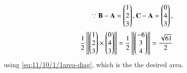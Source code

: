 \begin{align}
\because \mathbf{B}-\mathbf{A} = \begin{pmatrix}1\\2\\3\end{pmatrix}, 
\mathbf{C}-\mathbf{A} = \begin{pmatrix}0\\4\\3\end{pmatrix},
\\
	\frac{1}{2} \left\lVert\begin{pmatrix}1\\2\\3\end{pmatrix} \times \begin{pmatrix}0\\4\\3\end{pmatrix}\right\rVert 
	= 	\frac{1}{2}\left\lVert\begin{pmatrix}-6\\3\\4\end{pmatrix}\right\rVert
= \frac{\sqrt{61}}{2}
\end{align}
			using 
        \eqref{eq:11/10/1/1area-diag}, 
which is the the desired area.





